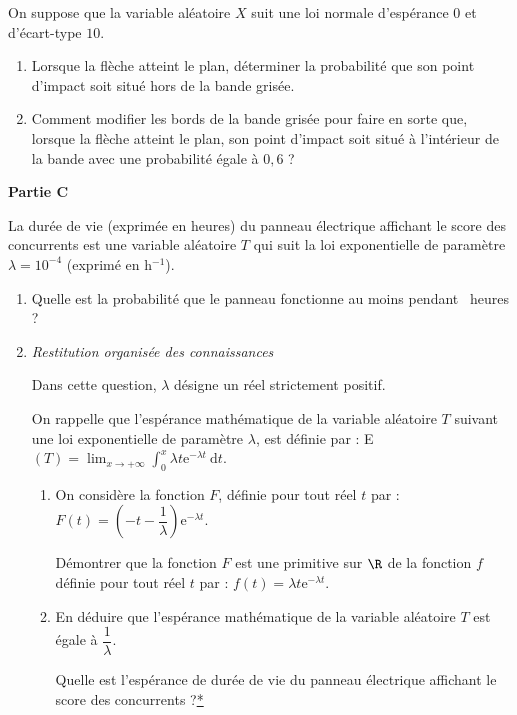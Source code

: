 \documentclass[12pt,french]{article}
\begin{document}
\begin{question}[subtitle={Asie 2015}]
On suppose que la variable aléatoire $X$ suit une loi normale d'espérance $0$ et d'écart-type $10$.

\medskip

\begin{enumerate}
\item Lorsque la flèche atteint le plan, déterminer la probabilité que son point d'impact soit situé hors de la bande grisée.
\item  Comment modifier les bords de la bande grisée pour faire en sorte que, lorsque la flèche atteint le plan, son point d'impact soit situé à l'intérieur de la bande avec une probabilité égale à $0,6$ ?
\end{enumerate}

\bigskip

\textbf{Partie C}

\medskip

La durée de vie (exprimée en heures) du panneau électrique affichant le score des concurrents est
une variable aléatoire $T$ qui suit la loi exponentielle de paramètre $\lambda = 10^{-4}$ (exprimé en h$^{-1}$).

\medskip

\begin{enumerate}
\item Quelle est la probabilité que le panneau fonctionne au moins pendant ~heures ?
\item \emph{Restitution organisée des connaissances}

Dans cette question, $\lambda$ désigne un réel strictement positif.

On rappelle que l'espérance mathématique de la variable aléatoire $T$ suivant une loi
exponentielle de paramètre $\lambda$, est définie par : E$(T) = \displaystyle\lim_{x \to + \infty} \displaystyle\int_0^x \lambda t \text{e}^{- \lambda t}\:\text{d}t$.
	\begin{enumerate}
		\item On considère la fonction $F$, définie pour tout réel $t$ par : $F(t) = \left(- t - \dfrac{1}{\lambda}\right)\text{e}^{- \lambda t}$.
		
Démontrer que la fonction $F$ est une primitive sur $\R$ de la fonction $f$ définie pour tout
réel $t$ par : $f(t) = \lambda t\text{e}^{- \lambda t}$.
		\item En déduire que l'espérance mathématique de la variable aléatoire $T$ est égale à $\dfrac{1}{\lambda}$.
		
Quelle est l'espérance de durée de vie du panneau électrique affichant le score des
concurrents ?\hyperlink{Index}{*}
	\end{enumerate}
\end{enumerate}

\end{question}
\end{document}
